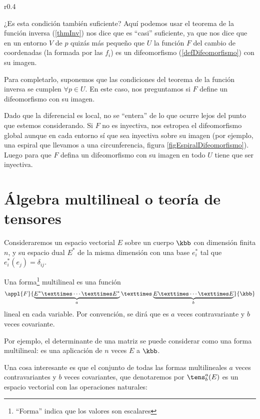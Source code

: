\begin{wrapfigure}{r}{0.4\textwidth}
\centering
{}
\caption{La aplicación $F$ que lleva la espiral a la circunferencia cumple el T.F.Inv. en todo punto, pero por no ser inyectiva no hay un difeomorfismo.}
\label{figEspiralDifeomorfismo}
\end{wrapfigure}

¿Es esta condición también suficiente? Aquí podemos usar el teorema de la función inversa (\ref{thmInv}) nos dice que es ``casi'' suficiente, ya que nos dice que en un entorno $V$ de $p$ quizás más pequeño que $U$ la función $F$ del cambio de coordenadas (la formada por las $f_i$) es un difeomorfismo (\ref{defDifeomorfismo}) con su imagen.


Para completarlo, suponemos que las condiciones del teorema de la función inversa se cumplen $∀p ∈ U$. En este caso, nos preguntamos si $F$ define un difeomorfismo con su imagen.

Dado que la diferencial es local, no se ``entera'' de lo que ocurre lejos del punto que estemos considerando. Si $F$ no es inyectiva, nos estropea el difeomorfismo global aunque en cada entorno sí que sea inyectiva sobre su imagen (por ejemplo, una espiral que llevamos a una circunferencia, figura \ref{figEspiralDifeomorfismo}). Luego para que $F$ defina un difeomorfismo con su imagen en todo $U$ tiene que ser inyectiva.

\section{Álgebra multilineal o teoría de tensores}

Consideraremos un espacio vectorial $E$ sobre un cuerpo $\kbb$ con dimensión finita $n$, y su espacio dual $E^*$ de la misma dimensión con una base $e^*_i$ tal que $e_i^*(e_j) = δ_{ij}$.

\begin{defn} Una forma\footnote{``Forma'' indica que los valores son escalares} multilineal es una función \[
\appl{F}{\underbrace{E^* × \dotsb × E^*}_{a} × \underbrace{E × \dotsb × E}_{b}}{\kbb} \] lineal en cada variable. Por convención, se dirá que es $a$ veces contravariante y $b$ veces covariante.
\end{defn}

Por ejemplo, el determinante de una matriz se puede considerar como una forma multilineal: es una aplicación de $n$ veces $E$ a $\kbb$.

Una cosa interesante es que el conjunto de todas las formas multilineales $a$ veces contravariantes y $b$ veces covariantes, que denotaremos por $\tens_b^a(E)$ es un espacio vectorial con las operaciones naturales:

